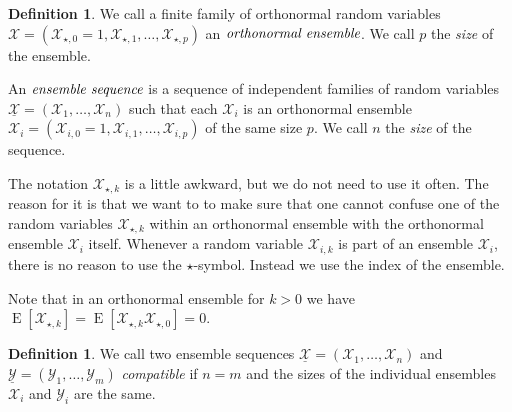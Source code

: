 \documentclass{daj}
\newcommand{\1}{\mathbbm{1}}
\theoremstyle{plain}
\theoremstyle{definition}
\newtheorem{definition}[theorem]{Definition}
\DeclareMathOperator*{\EE}{E}
\begin{document}
\begin{definition}
We call a finite family of orthonormal random variables
$\mathcal{X} = (\mathcal{X}_{\star,0} = 1, \mathcal{X}_{\star,1}, 
\ldots, \mathcal{X}_{\star,p})$
an $\emph{orthonormal ensemble}$. 
We call $p$ the \emph{size} of the ensemble.

An $\emph{ensemble sequence}$ is a sequence of independent families of 
random variables
$\underline{\mathcal{X}} = (\mathcal{X}_1, \ldots, \mathcal{X}_n)$
such that each $\mathcal{X}_i$ is an orthonormal ensemble
$\mathcal{X}_i = (\mathcal{X}_{i,0} = 1, \mathcal{X}_{i,1}, 
\ldots, \mathcal{X}_{i,p})$ of the same size $p$.
We call $n$ the \emph{size} of the sequence. 
\end{definition}
The notation $\mathcal{X}_{\star, k}$ is a little awkward, but we do not
need to use it often.
The reason for it is that we want to to make sure that one cannot confuse 
one of the random variables $\mathcal{X}_{\star,k}$ within an orthonormal
ensemble with the orthonormal ensemble $\mathcal{X}_i$ itself.
Whenever a random variable $\mathcal{X}_{i,k}$ is part of an ensemble
$\mathcal{X}_i$, 
there is no reason to use the $\star$-symbol.
Instead we use the index of the ensemble.

Note that in an orthonormal ensemble for $k>0$ we have $\EE[\mathcal{X}_{\star,k}]
= \EE[\mathcal{X}_{\star,k}\mathcal{X}_{\star,0}] = 0$.

\begin{definition}
We call two ensemble sequences 
$\underline{\mathcal{X}} = (\mathcal{X}_1, \ldots, \mathcal{X}_n)$
and $\underline{\mathcal{Y}} = (\mathcal{Y}_1, \ldots, \mathcal{Y}_m)$
\emph{compatible} if $n = m$ and the sizes of the individual ensembles
$\mathcal{X}_i$ and $\mathcal{Y}_i$ are the same.
\end{definition}
\end{document}
